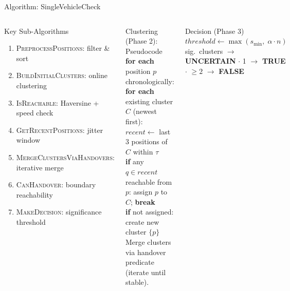\documentclass[aspectratio=169,xcolor=dvipsnames,9pt]{beamer}
\begin{document}
\begin{frame}{Algorithm: SingleVehicleCheck}
    \vspace*{-0.8em}
    \begin{columns}[T]
        \begin{block}{Key Sub-Algorithms}
            \scriptsize
            \begin{enumerate}
                \item \textsc{PreprocessPositions}: filter \& sort
                \item \textsc{BuildInitialClusters}: online clustering
                \item \textsc{IsReachable}: Haversine + speed check
                \item \textsc{GetRecentPositions}: jitter window
                \item \textsc{MergeClustersViaHandovers}: iterative merge
                \item \textsc{CanHandover}: boundary reachability
                \item \textsc{MakeDecision}: significance threshold
            \end{enumerate}
        \end{block}

        \vspace{0.15em}
        \begin{block}{Clustering (Phase 2): Pseudocode}
            \scriptsize
            \textbf{for each} position $p$ chronologically:\\
            \quad \textbf{for each} existing cluster $C$ (newest first):\\
            \quad\quad $\mathit{recent} \leftarrow$ last 3 positions of $C$ within $\tau$\\
            \quad\quad \textbf{if} any $q \in \mathit{recent}$ reachable from $p$: assign $p$ to $C$; \textbf{break}\\
            \quad \textbf{if} not assigned: create new cluster $\{p\}$\\
            Merge clusters via handover predicate (iterate until stable).
        \end{block}

        \vspace{0.15em}
        \begin{block}{Decision (Phase 3)}
            \scriptsize
            $\mathit{threshold} \leftarrow \max(s_{\min},\; \alpha \cdot n)$ sig.\ clusters $\to$ \textbf{UNCERTAIN} $\cdot$
            1 $\to$ \textbf{TRUE} $\cdot$
            $\geq\!2$ $\to$ \alert{\textbf{FALSE}}
        \end{block}


\end{columns}
\end{frame}
\end{document}

